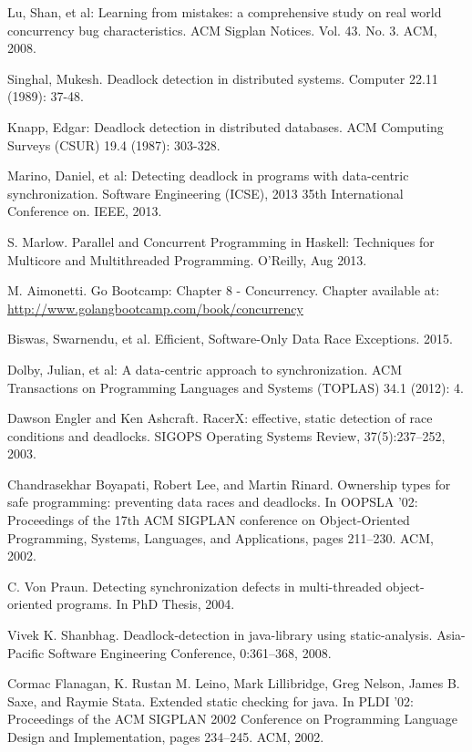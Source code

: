 \begin{thebibliography}{4}

 Lu, Shan, et al: Learning from mistakes: a comprehensive study on real world concurrency bug characteristics.
ACM Sigplan Notices. Vol. 43. No. 3. ACM, 2008.

 Singhal, Mukesh. Deadlock detection in distributed systems.
Computer 22.11 (1989): 37-48.

 Knapp, Edgar: Deadlock detection in distributed databases.
ACM Computing Surveys (CSUR) 19.4 (1987): 303-328.

 Marino, Daniel, et al: Detecting deadlock in programs with data-centric synchronization.
Software Engineering (ICSE), 2013 35th International Conference on. IEEE, 2013.

 S. Marlow. Parallel and Concurrent Programming in Haskell: Techniques for Multicore and Multithreaded Programming. O'Reilly, Aug 2013.

 M. Aimonetti. Go Bootcamp: Chapter 8 - Concurrency. Chapter available at: \url{http://www.golangbootcamp.com/book/concurrency}

 Biswas, Swarnendu, et al. Efficient, Software-Only Data Race Exceptions. 2015.

 Dolby, Julian, et al: A data-centric approach to synchronization.
ACM Transactions on Programming Languages and Systems (TOPLAS) 34.1 (2012): 4.

 Dawson Engler and Ken Ashcraft. RacerX: effective, static detection of race conditions and
deadlocks. SIGOPS Operating Systems Review, 37(5):237–252, 2003.

 Chandrasekhar Boyapati, Robert Lee, and Martin Rinard. Ownership types for safe programming:
preventing data races and deadlocks. In OOPSLA ’02: Proceedings of the 17th
ACM SIGPLAN conference on Object-Oriented Programming, Systems, Languages, and Applications,
pages 211–230. ACM, 2002.

 C. Von Praun. Detecting synchronization defects in multi-threaded object-oriented programs.
In PhD Thesis, 2004.

 Vivek K. Shanbhag. Deadlock-detection in java-library using static-analysis. Asia-Pacific
Software Engineering Conference, 0:361–368, 2008.

 Cormac Flanagan, K. Rustan M. Leino, Mark Lillibridge, Greg Nelson, James B. Saxe, and
Raymie Stata. Extended static checking for java. In PLDI ’02: Proceedings of the ACM
SIGPLAN 2002 Conference on Programming Language Design and Implementation, pages
234–245. ACM, 2002.


\end{thebibliography}
